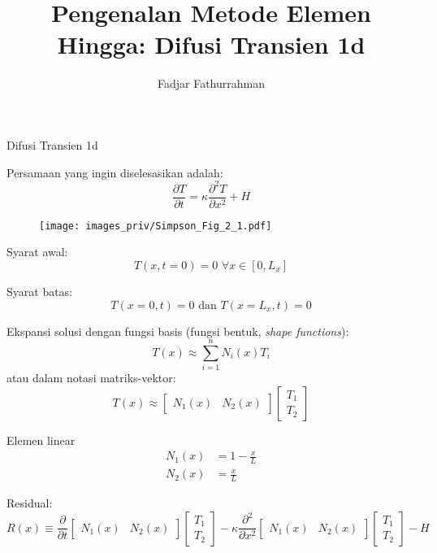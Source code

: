 %




\title{Pengenalan Metode Elemen Hingga: Difusi Transien 1d}
\author{Fadjar Fathurrahman}
\date{}
\maketitle

Difusi Transien 1d

Persamaan yang ingin diselesasikan adalah:
\begin{equation*}
\frac{\partial T}{\partial t} = \kappa \frac{\partial^2 T}{\partial x^2} + H
\end{equation*}

\begin{figure}[h]
{\centering
\texttt{[image: images\_priv/Simpson\_Fig\_2\_1.pdf]}
\par}
\end{figure}

Syarat awal:
\begin{equation*}
T(x,t=0) = 0 \,\, \forall x \in [0,L_{x}]
\end{equation*}

Syarat batas:
\begin{equation*}
T(x=0,t) = 0 \,\, \text{dan} \,\, T(x=L_{x},t) = 0
\end{equation*}


Ekspansi solusi dengan fungsi basis (fungsi bentuk, \textit{shape functions}):
\begin{equation*}
T(x) \approx \sum_{i=1}^{n} N_{i}(x) T_{i}
\end{equation*}
atau dalam notasi matriks-vektor:
\begin{equation*}
T(x) \approx \begin{bmatrix}
N_{1}(x) & N_{2}(x)
\end{bmatrix} \begin{bmatrix}
T_{1} \\ T_{2}
\end{bmatrix}
\end{equation*}


Elemen linear
\begin{align*}
N_{1}(x) & = 1 - \frac{x}{L} \\
N_{2}(x) & = \frac{x}{L}
\end{align*}

Residual:
\begin{equation*}
R(x) \equiv
\frac{\partial}{\partial t} \begin{bmatrix}
N_{1}(x) & N_{2}(x) \end{bmatrix} \begin{bmatrix} T_{1} \\ T_{2} \end{bmatrix} -
\kappa \frac{\partial^2}{\partial x^2} \begin{bmatrix}
N_{1}(x) & N_{2}(x) \end{bmatrix} \begin{bmatrix} T_{1} \\ T_{2} \end{bmatrix} - H
\end{equation*}

